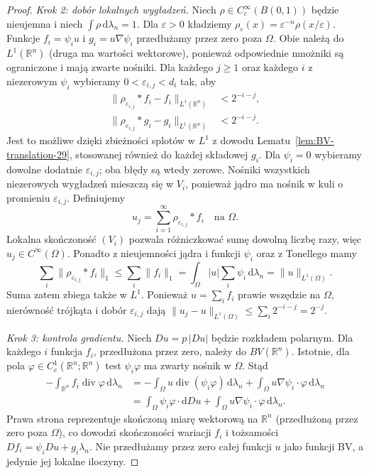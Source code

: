 \begin{proof}
\emph{Krok 2: dobór lokalnych wygładzeń.}
Niech $\rho\in C_c^\infty(B(0,1))$ będzie
nieujemna i niech $\int\rho\,\mathrm d\lambda_n=1$.
Dla $\varepsilon>0$ kładziemy
$\rho_\varepsilon(x)=\varepsilon^{-n}\rho(x/\varepsilon)$.
Funkcje $f_i=\psi_i u$ i $g_i=u\nabla\psi_i$
przedłużamy przez zero poza $\Omega$.
Obie należą do $L^1(\mathbb R^n)$ (druga
ma wartości wektorowe), ponieważ odpowiednie
mnożniki są ograniczone i mają zwarte nośniki.
Dla każdego $j\ge1$ oraz każdego $i$
z niezerowym $\psi_i$ wybieramy
$0<\varepsilon_{i,j}<d_i$ tak, aby
\begin{align*}
 \|\rho_{\varepsilon_{i,j}}*f_i-f_i\|_{L^1(\mathbb R^n)}
 &<2^{-i-j},\\
 \|\rho_{\varepsilon_{i,j}}*g_i-g_i\|_{L^1(\mathbb R^n)}
 &<2^{-i-j}.
\end{align*}
Jest to możliwe dzięki zbieżności splotów w $L^1$
z dowodu Lematu~\ref{lem:BV-translation-29},
stosowanej również do każdej składowej $g_i$.
Dla $\psi_i=0$ wybieramy dowolne dodatnie
$\varepsilon_{i,j}$; oba błędy są wtedy zerowe.
Nośniki wszystkich niezerowych wygładzeń
mieszczą się w $V_i$, ponieważ jądro ma nośnik
w kuli o promieniu $\varepsilon_{i,j}$.
Definiujemy
\[
 u_j=\sum_{i=1}^\infty\rho_{\varepsilon_{i,j}}*f_i
 \quad\text{na }\Omega.
\]
Lokalna skończoność $(V_i)$ pozwala różniczkować
sumę dowolną liczbę razy, więc $u_j\in C^\infty(\Omega)$.
Ponadto z nieujemności jądra i funkcji $\psi_i$
oraz z Tonellego mamy
\[
 \sum_i\|\rho_{\varepsilon_{i,j}}*f_i\|_1
 \le\sum_i\|f_i\|_1
 =\int_\Omega |u|\sum_i\psi_i\,\mathrm d\lambda_n
 =\|u\|_{L^1(\Omega)}.
\]
Suma zatem zbiega także w $L^1$.
Ponieważ $u=\sum_i f_i$ prawie wszędzie
na $\Omega$, nierówność trójkąta i dobór
$\varepsilon_{i,j}$ dają
$\|u_j-u\|_{L^1(\Omega)}\le\sum_i2^{-i-j}=2^{-j}$.

\emph{Krok 3: kontrola gradientu.}
Niech $Du=p\,|Du|$ będzie rozkładem polarnym.
Dla każdego $i$ funkcja $f_i$, przedłużona
przez zero, należy do $BV(\mathbb R^n)$.
Istotnie, dla pola $\varphi\in
C_c^1(\mathbb R^n;\mathbb R^n)$ test
$\psi_i\varphi$ ma zwarty nośnik w $\Omega$.
Stąd
\begin{align*}
 -\int_{\mathbb R^n} f_i\operatorname{div}\varphi
 \,\mathrm d\lambda_n
 &=-\int_\Omega u\operatorname{div}(\psi_i\varphi)
 \,\mathrm d\lambda_n
 +\int_\Omega u\nabla\psi_i\cdot\varphi\,\mathrm d\lambda_n\\
 &=\int_\Omega\psi_i\varphi\cdot\mathrm dDu
 +\int_\Omega u\nabla\psi_i\cdot\varphi\,\mathrm d\lambda_n.
\end{align*}
Prawa strona reprezentuje skończoną miarę
wektorową na $\mathbb R^n$ (przedłużoną przez zero
poza $\Omega$), co dowodzi skończoności wariacji
$f_i$ i tożsamości
$Df_i=\psi_i Du+g_i\lambda_n$.
Nie przedłużamy przez zero całej funkcji $u$
jako funkcji BV, a jedynie jej lokalne iloczyny.


\end{proof}
